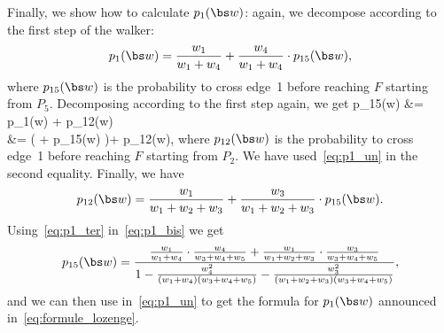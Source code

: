 Finally, we show how to calculate $p_1(\bs w)$: again, we decompose according to the first step of the walker:
\begin{equation}\label{eq:p1_un}
p_1(\bs w)
= \frac{w_1}{w_1+w_4} + \frac{w_4}{w_1+w_4}\cdot p_{15}(\bs w),
\end{equation}
where $p_{15}(\bs w)$ is the probability to cross edge~1 before reaching $F$ starting from $P_5$.
Decomposing according to the first step again, we get
\ban
p_{15}(\bs w)
&= \cdot p_1(\bs w) + \cdot p_{12}(\bs w)\notag\\
&=  \Bigl(  + \cdot p_{15}(\bs w) \Bigr)+ \cdot p_{12}(\bs w),\label{eq:p1_bis}
\ean
where $p_{12}(\bs w)$ is the probability to cross edge~1 before reaching $F$ starting from $P_2$.
We have used~\eqref{eq:p1_un} in the second equality.
Finally, we have
\begin{equation}\label{eq:p1_ter}
p_{12}(\bs w)= \frac{w_1}{w_1+w_2+w_3} + \frac{w_3}{w_1+w_2+w_3}\cdot p_{15}(\bs w).
\end{equation}
Using~\eqref{eq:p1_ter} in~\eqref{eq:p1_bis} we get
\[
p_{15}(\bs w)
= \frac{\frac{w_1}{w_1+w_4}\cdot\frac{w_4}{w_3+w_4+w_5}+ \frac{w_1}{w_1+w_2+w_3}\cdot\frac{w_3}{w_3+w_4+w_5}}
{1-\frac{w_4^2}{(w_1+w_4)(w_3+w_4+w_5)}-\frac{w_3^2}{(w_1+w_2+w_3)(w_3+w_4+w_5)}},
\]
and we can then use in~\eqref{eq:p1_un} to get the formula for $p_1(\bs w)$ announced in~\eqref{eq:formule_lozenge}.

